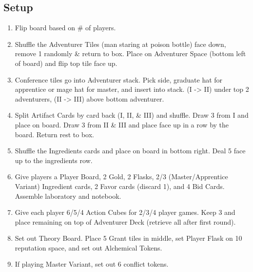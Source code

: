 \documentclass[12pt]{article}
\newenvironment{enumerateCustom}
{\begin{enumerate}
  \setlength{\itemsep}{1pt}
  \setlength{\parskip}{0pt}
  \setlength{\parsep}{0pt}}
{\end{enumerate}}
\begin{document}
\begin{multicols*}{2}

\section*{Setup}
\begin{enumerateCustom}
    \item Flip board based on \# of players.
    \item Shuffle the Adventurer Tiles (man staring at poison bottle) face down, remove 1 randomly \& return to box. Place on Adventurer Space (bottom left of board) and flip top tile face up.
    \item Conference tiles go into Adventurer stack. Pick side, graduate hat for apprentice or mage hat for master, and insert into stack. (I -> II) under top 2 adventurers, (II -> III) above bottom adventurer.
    \item Split Artifact Cards by card back (I, II, \& III) and shuffle. Draw 3 from I and place on board. Draw 3 from II \& III and place face up in a row by the board. Return rest to box.
    \item Shuffle the Ingredients cards and place on board in bottom right. Deal 5 face up to the ingredients row.
    \item Give players a Player Board, 2 Gold, 2 Flasks, 2/3 (Master/Apprentice Variant) Ingredient cards, 2 Favor cards (discard 1), and 4 Bid Cards. Assemble laboratory and notebook.
    \item Give each player 6/5/4 Action Cubes for 2/3/4 player games. Keep 3 and place remaining on top of Adventurer Deck (retrieve all after first round).
    \item Set out Theory Board. Place 5 Grant tiles in middle, set Player Flask on 10 reputation space, and set out Alchemical Tokens.
    \item If playing Master Variant, set out 6 conflict tokens.
\end{enumerateCustom}


\end{multicols*}
\end{document}
